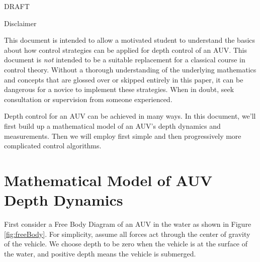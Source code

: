 \documentclass{article}
\begin{document}
\maketitle

\begin{center}
\Huge 
DRAFT
\normalsize
\end{center}
\vspace{4cm}

Disclaimer

This document is intended to allow a motivated student to understand the basics about how control strategies can be applied for depth control of an AUV.  This document is \emph{not} intended to be a suitable replacement for a classical course in control theory.  Without a thorough understanding of the underlying mathematics and concepts that are glossed over or skipped entirely in this paper, it can be dangerous for a novice to implement these strategies.  When in doubt, seek consultation or supervision from someone experienced.

\newpage

Depth control for an AUV can be achieved in many ways.  In this document, we'll first build up a mathematical model of an AUV's depth dynamics and measurements.  Then we will employ first simple and then progressively more complicated control algorithms.   

\section{Mathematical Model of AUV Depth Dynamics}

First consider a Free Body Diagram of an AUV in the water as shown in Figure \ref{fig:freeBody}.  For simplicity, assume all forces act through the center of gravity of the vehicle.  We choose depth to be zero when the vehicle is at the surface of the water, and positive depth means the vehicle is submerged.  
\end{document}
